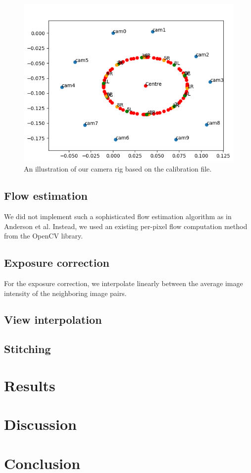 \documentclass[10pt,twocolumn,letterpaper]{article}
\begin{document}
\begin{figure}[t]
\begin{center}
   \includegraphics[width=0.8\linewidth]{pictures/our_camera_rig.png}
\end{center}
   \caption{An illustration of our camera rig based on the calibration file.}
\label{fig:long}
\label{fig:onecol}
\end{figure}

\subsection{Flow estimation}
We did not implement such a sophisticated flow estimation algorithm as in Anderson et al. Instead, we used an existing per-pixel flow computation method from the OpenCV library.

\subsection{Exposure correction}
For the exposure correction, we interpolate linearly between the average image intensity of the neighboring image pairs.
\subsection{View interpolation}

\subsection{Stitching}



\section{Results}


\section{Discussion}


\section{Conclusion}







{\small


}
\end{document}
